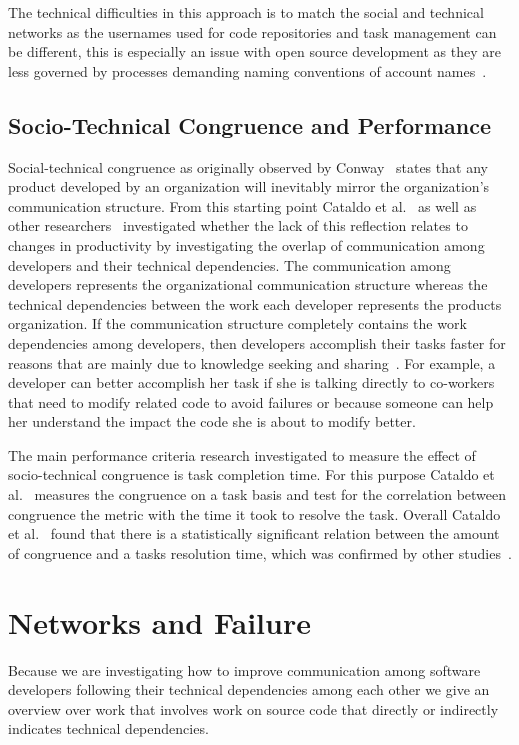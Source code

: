 The technical difficulties in this approach is to match the social and technical networks as the usernames used for code repositories and task management can be different, this is especially an issue with open source development as they are less governed by processes demanding naming conventions of account names~\cite{schroeter:isese:2006}.

\subsection{Socio-Technical Congruence and Performance}
Social-technical congruence as originally observed by Conway~\cite{conway:datamination:1968} states that any product developed by an organization will inevitably mirror the organization's communication structure.
From this starting point Cataldo et al.~\cite{cataldo:cscw:2006} as well as other researchers~\cite{valetto:msr:2007,ducheneaut:cscw:2005,ehrlich:stc:2008} investigated whether the lack of this reflection relates to changes in productivity by investigating the overlap of communication among developers and their technical dependencies.
The communication among developers represents the organizational communication structure whereas the technical dependencies between the work each developer represents the products organization.
If the communication structure completely contains the work dependencies among developers, then developers accomplish their tasks faster for reasons that are mainly due to knowledge seeking and sharing~\cite{desouza2006:knowledge}.
For example, a developer can better accomplish her task if she is talking directly to co-workers that need to modify related code to avoid failures or because someone can help her understand the impact the code she is about to modify better.

The main performance criteria research investigated to measure the effect of socio-technical congruence is task completion time.
For this purpose Cataldo et al.~\cite{cataldo:cscw:2006} measures the congruence on a task basis and test for the correlation between congruence the metric with the time it took to resolve the task.
Overall Cataldo et al.~\cite{cataldo:cscw:2006} found that there is a statistically significant relation between the amount of congruence and a tasks resolution time, which was confirmed by other studies~\cite{valetto:msr:2007,ehrlich:stc:2008}.


\section{Networks and Failure}
Because we are investigating how to improve communication among software developers following their technical dependencies among each other we give an overview over work that involves work on source code that directly or indirectly indicates technical dependencies. 

